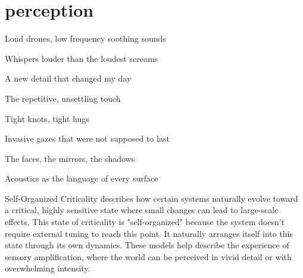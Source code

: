 \chapter*{perception}
\begin{center}
\vspace{2cm}
\begin{flushright}
Loud drones, low frequency soothing sounds

Whispers louder than the loudest screams

A new detail that changed my day

The repetitive, unsettling touch

Tight knots, tight hugs

Invasive gazes that were not supposed to last

The faces, the mirrors, the shadows

Acoustics as the language of every surface

\end{flushright}
\vspace{2cm}
\end{center}
\normalsize

Self-Organized Criticality describes how certain systems naturally evolve toward a critical, highly sensitive state where small changes can lead to large-scale effects. This state of criticality is "self-organized" because the system doesn’t require external tuning to reach this point. It naturally arranges itself into this state through its own dynamics. These models help describe the experience of sensory amplification, where the world can be perceived in vivid detail or with overwhelming intensity. \citep{adami1993}


